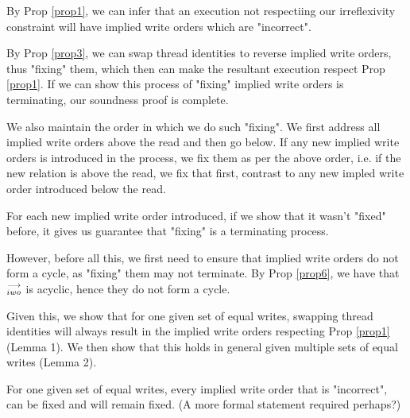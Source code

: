         By Prop \ref{prop1}, we can infer that an execution not respectiing our irreflexivity constraint will have implied write orders which are "incorrect". 

        
        By Prop \ref{prop3}, we can swap thread identities to reverse implied write orders, thus "fixing" them, which then can make the resultant execution respect Prop \ref{prop1}. If we can show this process of "fixing" implied write orders is terminating, our soundness proof is complete. 

        We also maintain the order in which we do such "fixing". We first address all implied write orders above the read and then go below. 
        If any new implied write orders is introduced in the process, we fix them as per the above order, i.e. if the new relation is above the read, we fix that first, contrast to any new impled write order introduced below the read. 
        
        For each new implied write order introduced, if we show that it wasn't "fixed" before, it gives us guarantee that "fixing" is a terminating process. 
        
        However, before all this, we first need to ensure that implied write orders do not form a cycle, as "fixing" them may not terminate.  By Prop \ref{prop6}, we have that $\stackrel{\longrightarrow}{_{iwo}}$ is acyclic, hence they do not form a cycle.  
        
        Given this, we show that for one given set of equal writes, swapping thread identities will always result in the implied write orders respecting Prop \ref{prop1} (Lemma 1). 
        We then show that this holds in general given multiple sets of equal writes (Lemma 2).  



        \begin{lemma}
            For one given set of equal writes, every implied write order that is "incorrect", can be fixed and will remain fixed.  
            (A more formal statement required perhaps?)
        \end{lemma}
            
